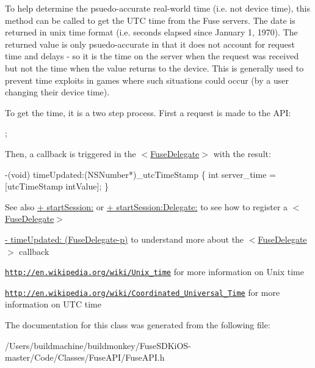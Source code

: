 To help determine the psuedo-\/accurate real-\/world time (i.\+e. not device time), this method can be called to get the U\+T\+C time from the Fuse servers. The date is returned in unix time format (i.\+e. seconds elapsed since January 1, 1970). The returned value is only psuedo-\/accurate in that it does not account for request time and delays -\/ so it is the time on the server when the request was received but not the time when the value returns to the device. This is generally used to prevent time exploits in games where such situations could occur (by a user changing their device time).

To get the time, it is a two step process. First a request is made to the A\+P\+I\+:


\begin{DoxyCode}
;
\end{DoxyCode}


Then, a callback is triggered in the $<$\hyperlink{protocol_fuse_delegate-p}{Fuse\+Delegate}$>$ with the result\+:


\begin{DoxyCode}
-(void) timeUpdated:(NSNumber*)\_utcTimeStamp
\{
   \textcolor{keywordtype}{int} server\_time = [utcTimeStamp intValue];
\}
\end{DoxyCode}


\begin{DoxySeeAlso}{See also}
\hyperlink{interface_fuse_a_p_i_ab8c3327287bfed0a8a9c74e6664d7717}{+ start\+Session\+:} or \hyperlink{interface_fuse_a_p_i_aab1649c81002a336ca872da6fef36b8d}{+ start\+Session\+:\+Delegate\+:} to see how to register a $<$\hyperlink{protocol_fuse_delegate-p}{Fuse\+Delegate}$>$ 

\hyperlink{protocol_fuse_delegate-p_a85c5468cf940315584698956edcbbdfd}{-\/ time\+Updated\+: (\+Fuse\+Delegate-\/p)} to understand more about the $<$\hyperlink{protocol_fuse_delegate-p}{Fuse\+Delegate}$>$ callback 

\href{http://en.wikipedia.org/wiki/Unix_time}{\tt http\+://en.\+wikipedia.\+org/wiki/\+Unix\+\_\+time} for more information on Unix time 

\href{http://en.wikipedia.org/wiki/Coordinated_Universal_Time}{\tt http\+://en.\+wikipedia.\+org/wiki/\+Coordinated\+\_\+\+Universal\+\_\+\+Time} for more information on U\+T\+C time 
\end{DoxySeeAlso}


The documentation for this class was generated from the following file\+:\begin{DoxyCompactItemize}
\item 
/\+Users/buildmachine/buildmonkey/\+Fuse\+S\+D\+Ki\+O\+S-\/master/\+Code/\+Classes/\+Fuse\+A\+P\+I/Fuse\+A\+P\+I.\+h\end{DoxyCompactItemize}
